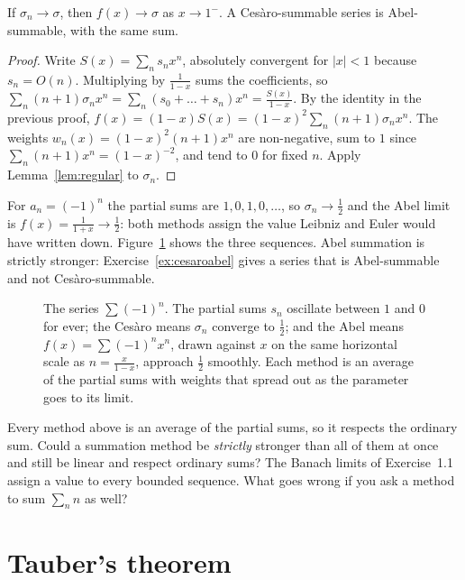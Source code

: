 \begin{corollary}\label{cor:cesaroabel}
If $\sigma_n\to\sigma$, then $f(x)\to\sigma$ as $x\to1^-$. A Ces\`aro-summable series is Abel-summable, with the same sum.
\end{corollary}
\begin{proof}
Write $S(x)=\sum_ns_nx^n$, absolutely convergent for $|x|<1$ because $s_n=O(n)$. Multiplying by $\frac1{1-x}$ sums the coefficients, so
$\sum_n(n+1)\sigma_nx^n=\sum_n(s_0+\dots+s_n)x^n=\frac{S(x)}{1-x}$. By the identity in the previous proof, $f(x)=(1-x)S(x)=(1-x)^2\sum_n(n+1)\sigma_nx^n$. The
weights $w_n(x)=(1-x)^2(n+1)x^n$ are non-negative, sum to $1$ since $\sum_n(n+1)x^n=(1-x)^{-2}$, and tend to $0$ for fixed $n$. Apply
Lemma~\ref{lem:regular} to $\sigma_n$.
\end{proof}

\begin{example}\label{ex:gregoryseries}
For $a_n=(-1)^n$ the partial sums are $1,0,1,0,\dots$, so $\sigma_n\to\frac12$ and the Abel limit is $f(x)=\frac1{1+x}\to\frac12$: both methods assign the
value Leibniz and Euler would have written down. Figure~\ref{fig:abelmeans} shows the three sequences. Abel summation is strictly stronger:
Exercise~\ref{ex:cesaroabel} gives a series that is Abel-summable and not Ces\`aro-summable.
\end{example}

\begin{figure}[ht]
\centering
{}
\caption{The series $\sum(-1)^n$. The partial sums $s_n$ oscillate between $1$ and $0$ for ever; the Ces\`aro means $\sigma_n$ converge to $\frac12$;
and the Abel means $f(x)=\sum(-1)^nx^n$, drawn against $x$ on the same horizontal scale as $n=\frac x{1-x}$, approach $\frac12$ smoothly. Each method
is an average of the partial sums with weights that spread out as the parameter goes to its limit.}
\label{fig:abelmeans}
\end{figure}

\begin{think}
Every method above is an average of the partial sums, so it respects the ordinary sum. Could a summation method be \emph{strictly} stronger than all of
them at once and still be linear and respect ordinary sums? The Banach limits of Exercise~1.1 assign a value to every bounded sequence. What goes wrong if
you ask a method to sum $\sum_nn$ as well?
\end{think}

\section{Tauber's theorem}


